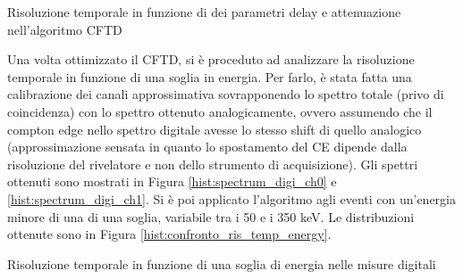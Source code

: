 

\begin{table}[h]
	\centering
	
	\caption{Risoluzione temporale in funzione di dei parametri delay e attenuazione nell'algoritmo CFTD}
	\label{tab:cftd_fwhm_digi}
\end{table}

Una volta ottimizzato il CFTD, si è proceduto ad analizzare la risoluzione temporale in funzione di una soglia in energia. Per farlo, è stata fatta una calibrazione dei canali approssimativa sovrapponendo lo spettro totale (privo di coincidenza) con lo spettro ottenuto analogicamente, ovvero assumendo che il compton edge nello spettro digitale avesse lo stesso shift di quello analogico (approssimazione sensata in quanto lo spostamento del CE dipende dalla risoluzione del rivelatore e non dello strumento di acquisizione). Gli spettri ottenuti sono mostrati in Figura \ref{hist:spectrum_digi_ch0} e \ref{hist:spectrum_digi_ch1}. Si è poi applicato l'algoritmo agli eventi con un'energia minore di una di una soglia, variabile tra i 50 e i 350 keV. Le distribuzioni ottenute sono in Figura \ref{hist:confronto_ris_temp_energy}.\\








\begin{table}[h]
	\centering
	
	\caption{Risoluzione temporale in funzione di una soglia di energia nelle misure digitali}
	\label{tab:threshold_fwhm_digi}
\end{table}
